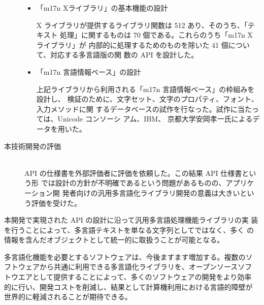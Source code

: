 \begin{description}
\begin{itemize}
\item 「m17n Xライブラリ」の基本機能の設計 

 X ライブラリが提供するライブラリ関数は 512 あり、そのうち、「テキスト
処理」に関するものは 70 個である。これらのうち「m17n X ライブラリ」が
内部的に処理するためのものを除いた 41 個について、対応する多言語版の関
数の API を設計した。

\item 「m17n 言語情報ベース」の設計

上記ライブラリから利用される「m17n 言語情報ベース」の枠組みを設計し、
検証のために、文字セット、文字のプロパティ、フォント、入力メソッドに関
するデータベースの試作を行なった。試作に当たっては、Unicode コンソーシ
アム、IBM、 京都大学安岡孝一氏によるデータを用いた。

\end{itemize}

\item[本技術開発の評価]~\\
API の仕様書を外部評価者に評価を依頼した。この結果 API 仕様書という形
では設計の方針が不明確であるという問題があるものの、アプリケーション開
発者向けの汎用多言語化ライブラリ開発の意義は大きいという評価を受けた。

\end{description}

本開発で実現された API の設計に沿って汎用多言語処理機能ライブラリの実
装を行うことによって、多言語テキストを単なる文字列としてではなく、多く
の情報を含んだオブジェクトとして統一的に取扱うことが可能となる。

多言語化機能を必要とするソフトウェアは、今後ますます増加する。複数のソ
フトウェアから共通に利用できる多言語化ライブラリを、オープンソースソフ
トウエアとして提供することによって、多くのソフトウェアの開発をより効率
的に行い、開発コストを削減し、結果として計算機利用における言語的障壁が
世界的に軽減されることが期待できる。

